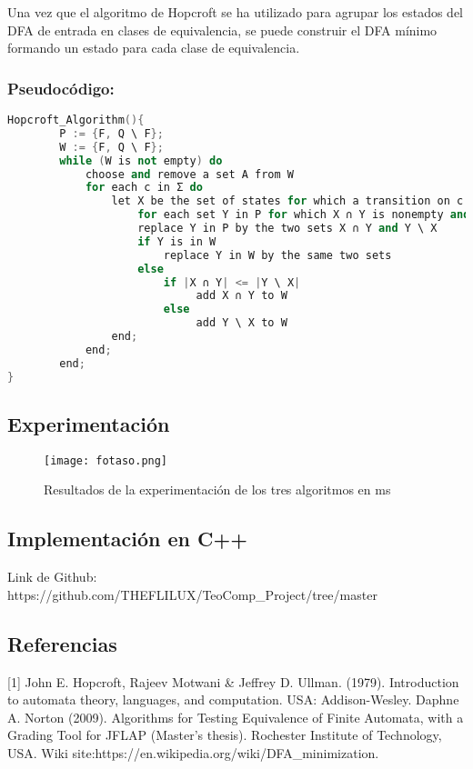 \documentclass[12pt]{article}
\begin{document}
Una vez que el algoritmo de Hopcroft se ha utilizado para agrupar los estados del DFA de entrada en clases de equivalencia, se puede construir el DFA mínimo formando un estado para cada clase de equivalencia. 

\newpage
\subsubsection{Pseudoc\'odigo:}
\begin{lstlisting}[language=c++]
Hopcroft_Algorithm(){
        P := {F, Q \ F};
        W := {F, Q \ F};
        while (W is not empty) do
            choose and remove a set A from W
            for each c in Σ do
                let X be the set of states for which a transition on c leads to a state in A
                    for each set Y in P for which X ∩ Y is nonempty and Y \ X is nonempty do
                    replace Y in P by the two sets X ∩ Y and Y \ X
                    if Y is in W
                        replace Y in W by the same two sets
                    else
                        if |X ∩ Y| <= |Y \ X|
                             add X ∩ Y to W
                        else
                             add Y \ X to W
                end;
            end;
        end;
}

\end{lstlisting}

\subsection{Experimentaci\'on}

\begin{figure}[h]
    \centering
    \texttt{[image: fotaso.png]}
    \caption{Resultados de la experimentación de los tres algoritmos en ms}
    \label{fig:my_label }
\end{figure}



\subsection{Implementaci\'on en C++}
Link de Github: https://github.com/THEFLILUX/TeoComp\_Project/tree/master


\subsection{Referencias}

[1] John E. Hopcroft, Rajeev Motwani & Jeffrey D. Ullman. (1979). Introduction to automata theory, languages, and computation. USA: Addison-Wesley.
\newline
\newline
[2] Daphne A. Norton (2009). Algorithms for Testing Equivalence of Finite
Automata, with a Grading Tool for JFLAP (Master's thesis). Rochester Institute of Technology, USA.
\newline
\newline
[3] Wiki site:https://en.wikipedia.org/wiki/DFA\_minimization.
\end{document}
